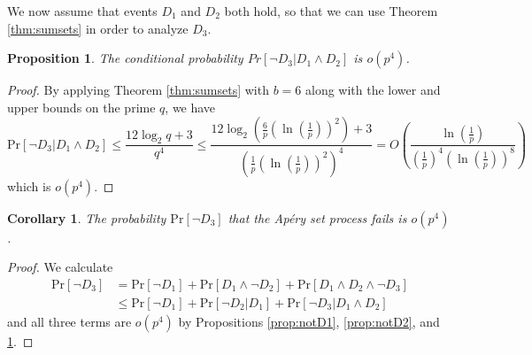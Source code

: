\documentclass[11pt]{amsart}
\newtheorem{proposition}[theorem]{Proposition}
\newtheorem{corollary}[theorem]{Corollary}
\theoremstyle{definition}
\theoremstyle{remark}
\def\Pr{\ensuremath{\mathrm{Pr}}}
\begin{document}
We now assume that events $D_1$ and $D_2$ both hold, so that we can use Theorem \ref{thm:sumsets} in order to analyze $D_3$.

\begin{proposition} \label{prop:notD3}
  The conditional probability $Pr[\lnot D_3 | D_1 \land D_2]$ is $o\left(p^4\right)$. 
\end{proposition}

\begin{proof}
  By applying Theorem \ref{thm:sumsets} with $b=6$ along with the lower and upper bounds on the prime $q$, we have
  \[ \Pr[ \lnot D_3 | D_1 \land D_2] \leq \frac{12 \log_2 q + 3}{q^4}
  \leq \frac{12 \log_2 \left( \frac{6}{p} \left( \ln \left( \frac{1}{p} \right) \right)^2 \right) + 3 }{\left( \frac{1}{p} \left( \ln \left( \frac{1}{p} \right) \right)^2 \right)^4 }
       = O \left( \frac{\ln \left( \frac{1}{p} \right)}{\left( \frac{1}{p} \right)^4 \left( \ln \left( \frac{1}{p} \right) \right)^8 } \right) 
       \]
       which is $o\left(p^4\right)$. 
\end{proof}

\begin{corollary} \label{cor:notD3}
  The probability $\Pr[\lnot D_3]$ that the Ap\'ery set process fails is $o\left(p^4\right)$. 
\end{corollary}

\begin{proof}
 We calculate 
 \begin{align*} \Pr[\lnot D_3] & = \Pr[\lnot D_1] + \Pr[D_1 \land \lnot D_2] + \Pr[D_1 \land D_2 \land \lnot D_3] \\
   & \leq \Pr[\lnot D_1] + \Pr[\lnot D_2 | D_1] + \Pr[\lnot D_3 | D_1 \land D_2] \end{align*}
  and all three terms are $o\left(p^4\right)$ by Propositions \ref{prop:notD1}, \ref{prop:notD2}, and \ref{prop:notD3}.
\end{proof}

\end{document}
